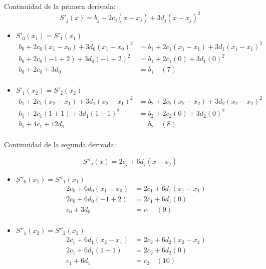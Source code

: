 \documentclass[12pt]{article}
\begin{document}
\begin{enumerate}
\begin{enumerate}
        Continuidad de la primera derivada:
        \[S'_j(x) = b_j + 2c_j(x - x_j) + 3d_j(x - x_j)^2\]
        
        \begin{itemize}
            \item $S'_0(x_1) =  S'_1(x_1)$
            \[
            \begin{aligned}
            b_0 + 2c_0(x_1 - x_0) + 3d_0(x_1 - x_0)^2 &= b_1 + 2c_1(x_1 - x_1) + 3d_1(x_1 - x_1)^2 \\
            b_0 + 2c_0(-1+2) + 3d_0(-1+2)^2 &= b_1 + 2c_1(0) + 3d_1(0)^2 \\
            b_0 + 2c_0 + 3d_0 &= b_1 \quad (7) \\
            \end{aligned}
            \]
            \item $S'_1(x_2) =  S'_2(x_2)$
            \[
            \begin{aligned}
            b_1 + 2c_1(x_2 - x_1) + 3d_1(x_2 - x_1)^2 &= b_2 + 2c_2(x_2 - x_2) + 3d_2(x_2 - x_2)^2 \\
            b_1 + 2c_1(1+1) + 3d_1(1+1)^2 &= b_2 + 2c_2(0) + 3d_2(0)^2 \\
            b_1 + 4c_1 + 12d_1 &= b_2 \quad (8)\\
            \end{aligned}
            \]
        \end{itemize}

        Continuidad de la segunda derivada:

        \[S''_j(x) = 2c_j + 6d_j(x -x_j)\]
        
        \begin{itemize}
            \item $S''_0(x_1) = S''_1(x_1)$
            \[
            \begin{aligned}
            2c_0 + 6d_0(x_1 -x_0) &= 2c_1 + 6d_1(x_1 -x_1) \\     
            2c_0 + 6d_0(-1+2) &= 2c_1 + 6d_1(0) \\     
            c_0 + 3d_0 &= c_1 \quad (9) \\     
            \end{aligned}
            \]
            \item $S''_1(x_2) = S''_2(x_2)$
            \[
            \begin{aligned}
            2c_1 + 6d_1(x_2 -x_1) &= 2c_2 + 6d_2(x_2 -x_2) \\ 
            2c_1 + 6d_1(1+1) &= 2c_2 + 6d_2(0) \\ 
            c_1 + 6d_1 &= c_2 \quad (10) \\ 
            \end{aligned}
            \]
        \end{itemize}


\end{enumerate}
\end{enumerate}
\end{document}
